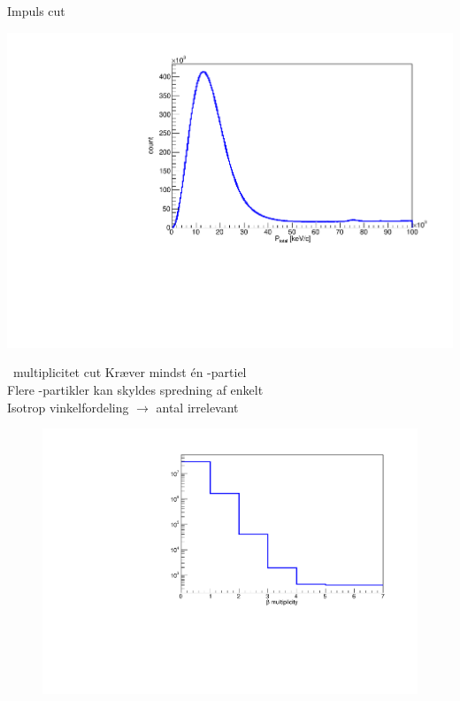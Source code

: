 \begin{frame}{Impuls cut}
	\begin{itemize}
	\end{itemize}
	\includegraphics[width=.7\columnwidth]{../figures/ptotNoCut.pdf}

\end{frame}

\begin{frame}{\be\ multiplicitet cut}
	Kræver mindst én \be-partiel\\
	Flere \be-partikler kan skyldes spredning af enkelt \be\\
	Isotrop vinkelfordeling $\rightarrow$ antal irrelevant
	\begin{figure}
		\includegraphics[width=.7\columnwidth]{../figures/betaMul.pdf}
	\end{figure}
\end{frame}
